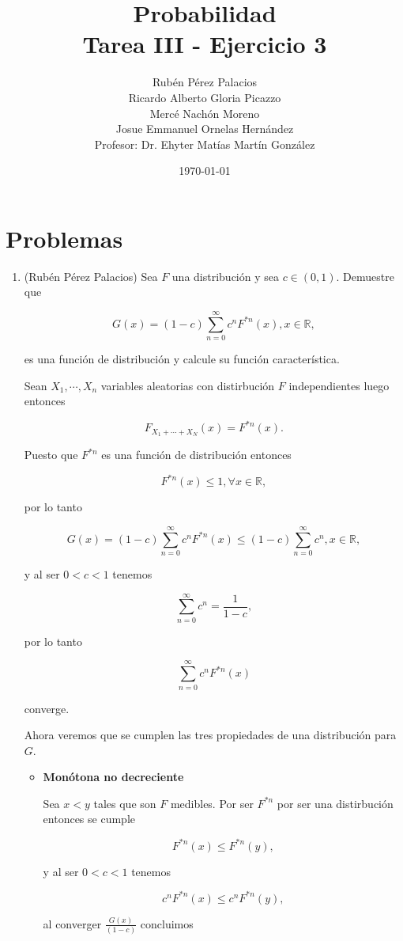 \documentclass[letterpaper]{article}
\title{Probabilidad \\Tarea III - Ejercicio 3}
\author{Rubén Pérez Palacios\\Ricardo Alberto Gloria Picazzo\\Mercé Nachón Moreno\\ Josue Emmanuel Ornelas Hernández\\Profesor: Dr. Ehyter Matías Martín González}
\date{\today}
\theoremstyle{definition}
\theoremstyle{lemathm}
\theoremstyle{lemademthm}
\newcommand{\RR}{\mathbb{R}}
\newcommand{\1}{\mathbbm{1}}
\begin{document}
	\maketitle
    
    \section*{Problemas}

    \begin{enumerate}
			
		\item (Rubén Pérez Palacios) Sea $F$ una distribución y sea $c \in (0,1)$. Demuestre que
		
		\[G(x) = (1-c)\sum_{n=0}^{\infty} c^nF^{*n}(x), x \in \RR,\]

		es una función de distribución y calcule su función característica.

		Sean $X_1,\cdots,X_n$ variables aleatorias con distirbución $F$ independientes luego entonces

		\[F_{X_1+\cdots+X_N}(x) = F^{*n}(x).\]

		Puesto que $F^{*n}$ es una función de distribución entonces

		\[F^{*n}(x) \leq 1, \forall x \in \RR,\]

		por lo tanto

		\[G(x) = (1-c)\sum_{n=0}^{\infty} c^nF^{*n}(x) \leq (1-c)\sum_{n=0}^{\infty} c^n, x \in \RR,\]

		y al ser $0 < c < 1$ tenemos
		
		\[\sum_{n=0}^{\infty} c^n = \frac{1}{1-c},\]
		
		por lo tanto
		
		\[\sum_{n=0}^{\infty} c^nF^{*n}(x)\]
		
		converge.

		Ahora veremos que se cumplen las tres propiedades de una distribución para $G$.

		\begin{itemize}
			\item \textbf{Monótona no decreciente}
			
			Sea $x < y$ tales que son $F$ medibles. Por ser $F^{*n}$ por ser una distirbución entonces se cumple

			\[F^{*n}(x) \leq F^{*n}(y),\]

			y al ser $0 < c < 1$ tenemos

			\[c^n F^{*n}(x) \leq c^n F^{*n}(y),\]

			al converger $\frac{G(x)}{(1-c)}$ concluimos
			

\end{itemize}
\end{enumerate}
\end{document}
